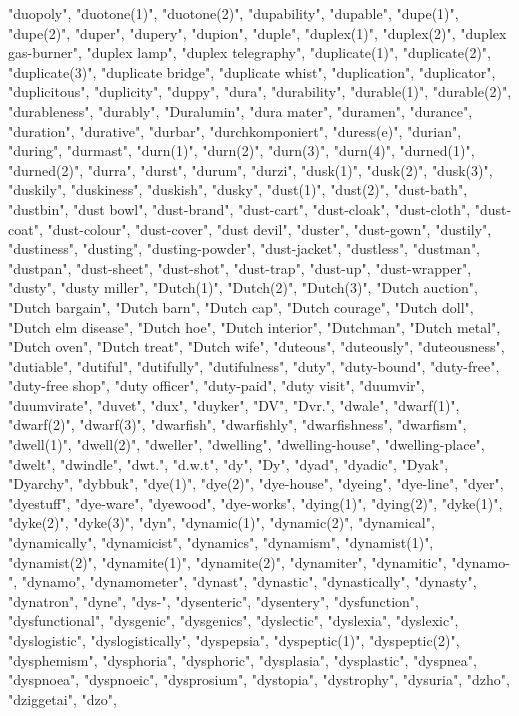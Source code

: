 "duopoly",
"duotone(1)",
"duotone(2)",
"dupability",
"dupable",
"dupe(1)",
"dupe(2)",
"duper",
"dupery",
"dupion",
"duple",
"duplex(1)",
"duplex(2)",
"duplex gas-burner",
"duplex lamp",
"duplex telegraphy",
"duplicate(1)",
"duplicate(2)",
"duplicate(3)",
"duplicate bridge",
"duplicate whist",
"duplication",
"duplicator",
"duplicitous",
"duplicity",
"duppy",
"dura",
"durability",
"durable(1)",
"durable(2)",
"durableness",
"durably",
"Duralumin",
"dura mater",
"duramen",
"durance",
"duration",
"durative",
"durbar",
"durchkomponiert",
"duress(e)",
"durian",
"during",
"durmast",
"durn(1)",
"durn(2)",
"durn(3)",
"durn(4)",
"durned(1)",
"durned(2)",
"durra",
"durst",
"durum",
"durzi",
"dusk(1)",
"dusk(2)",
"dusk(3)",
"duskily",
"duskiness",
"duskish",
"dusky",
"dust(1)",
"dust(2)",
"dust-bath",
"dustbin",
"dust bowl",
"dust-brand",
"dust-cart",
"dust-cloak",
"dust-cloth",
"dust-coat",
"dust-colour",
"dust-cover",
"dust devil",
"duster",
"dust-gown",
"dustily",
"dustiness",
"dusting",
"dusting-powder",
"dust-jacket",
"dustless",
"dustman",
"dustpan",
"dust-sheet",
"dust-shot",
"dust-trap",
"dust-up",
"dust-wrapper",
"dusty",
"dusty miller",
"Dutch(1)",
"Dutch(2)",
"Dutch(3)",
"Dutch auction",
"Dutch bargain",
"Dutch barn",
"Dutch cap",
"Dutch courage",
"Dutch doll",
"Dutch elm disease",
"Dutch hoe",
"Dutch interior",
"Dutchman",
"Dutch metal",
"Dutch oven",
"Dutch treat",
"Dutch wife",
"duteous",
"duteously",
"duteousness",
"dutiable",
"dutiful",
"dutifully",
"dutifulness",
"duty",
"duty-bound",
"duty-free",
"duty-free shop",
"duty officer",
"duty-paid",
"duty visit",
"duumvir",
"duumvirate",
"duvet",
"dux",
"duyker",
"DV",
"Dvr.",
"dwale",
"dwarf(1)",
"dwarf(2)",
"dwarf(3)",
"dwarfish",
"dwarfishly",
"dwarfishness",
"dwarfism",
"dwell(1)",
"dwell(2)",
"dweller",
"dwelling",
"dwelling-house",
"dwelling-place",
"dwelt",
"dwindle",
"dwt.",
"d.w.t",
"dy",
"Dy",
"dyad",
"dyadic",
"Dyak",
"Dyarchy",
"dybbuk",
"dye(1)",
"dye(2)",
"dye-house",
"dyeing",
"dye-line",
"dyer",
"dyestuff",
"dye-ware",
"dyewood",
"dye-works",
"dying(1)",
"dying(2)",
"dyke(1)",
"dyke(2)",
"dyke(3)",
"dyn",
"dynamic(1)",
"dynamic(2)",
"dynamical",
"dynamically",
"dynamicist",
"dynamics",
"dynamism",
"dynamist(1)",
"dynamist(2)",
"dynamite(1)",
"dynamite(2)",
"dynamiter",
"dynamitic",
"dynamo-",
"dynamo",
"dynamometer",
"dynast",
"dynastic",
"dynastically",
"dynasty",
"dynatron",
"dyne",
"dys-",
"dysenteric",
"dysentery",
"dysfunction",
"dysfunctional",
"dysgenic",
"dysgenics",
"dyslectic",
"dyslexia",
"dyslexic",
"dyslogistic",
"dyslogistically",
"dyspepsia",
"dyspeptic(1)",
"dyspeptic(2)",
"dysphemism",
"dysphoria",
"dysphoric",
"dysplasia",
"dysplastic",
"dyspnea",
"dyspnoea",
"dyspnoeic",
"dysprosium",
"dystopia",
"dystrophy",
"dysuria",
"dzho",
"dziggetai",
"dzo",
